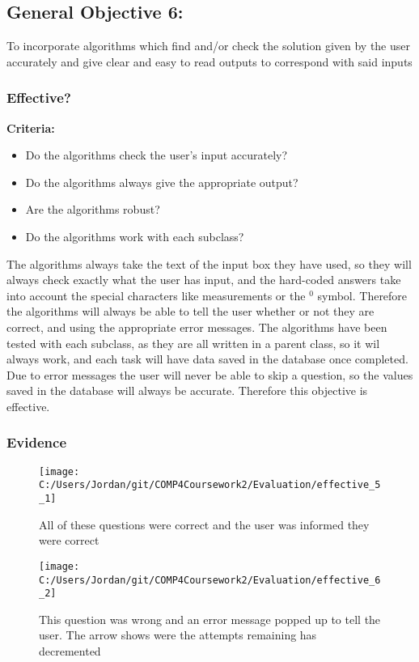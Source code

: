 \subsection{General Objective 6: }

To incorporate algorithms which find and/or check the solution given by the user accurately and give clear and easy to read outputs to correspond with said inputs

\subsubsection{Effective?}

\textbf{Criteria: }

\begin{itemize}
	\item Do the algorithms check the user's input accurately?
	\item Do the algorithms always give the appropriate output?
	\item Are the algorithms robust?
	\item Do the algorithms work with each subclass?
\end{itemize}

The algorithms always take the text of the input box they have used, so they will always check exactly what the user has input, and the hard-coded answers take into account the special characters like measurements or the {$^0$} symbol. Therefore the algorithms will always be able to tell the user whether or not they are correct, and using the appropriate error messages. The algorithms have been tested with each subclass, as they are all written in a parent class, so it wil always work, and each task will have data saved in the database once completed. Due to error messages the user will never be able to skip a question, so the values saved in the database will always be accurate. Therefore this objective is effective.

\subsubsection{Evidence}

\begin{figure}[H]
	\texttt{[image: C:/Users/Jordan/git/COMP4Coursework2/Evaluation/effective\_5\_1]}
	\caption{All of these questions were correct and the user was informed they were correct}
\end{figure}

\begin{figure}[H]
	\texttt{[image: C:/Users/Jordan/git/COMP4Coursework2/Evaluation/effective\_6\_2]}
	\caption{This question was wrong and an error message popped up to tell the user. The arrow shows were the attempts remaining has decremented}
\end{figure}

